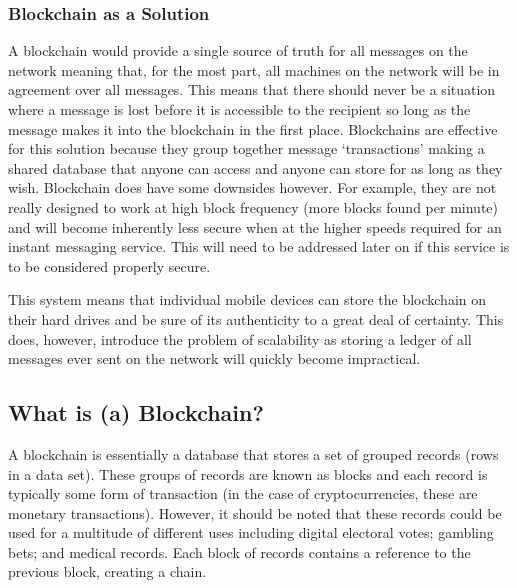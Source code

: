 \documentclass{article}
\begin{document}
\subsubsection{Blockchain as a Solution}
A blockchain would provide a single source of truth for all messages on the network meaning that, for the most part, all machines on the network will be in agreement over all messages. This means that there should never be a situation where a message is lost before it is accessible to the recipient so long as the message makes it into the blockchain in the first place. Blockchains are effective for this solution because they group together message `transactions' making a shared database that anyone can access and anyone can store for as long as they wish. Blockchain does have some downsides however. For example, they are not really designed to work at high block frequency (more blocks found per minute) and will become inherently less secure when at the higher speeds required for an instant messaging service. This will need to be addressed later on if this service is to be considered properly secure.

This system means that individual mobile devices can store the blockchain on their hard drives and be sure of its authenticity to a great deal of certainty. This does, however, introduce the problem of scalability as storing a ledger of all messages ever sent on the network will quickly become impractical.

\subsection{What is (a) Blockchain?}\label{subsubsec:whatisablockchain}
A blockchain is essentially a database that stores a set of grouped records (rows in a data set). These groups of records are known as blocks and each record is typically some form of transaction (in the case of cryptocurrencies, these are monetary transactions). However, it should be noted that these records could be used for a multitude of different uses including digital electoral votes; gambling bets; and medical records. Each block of records contains a reference to the previous block, creating a chain.
\end{document}
